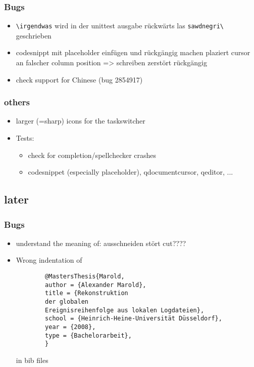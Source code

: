 \documentclass[10pt,a4paper,landscape]{report}
\begin{document}
\subsubsection{Bugs}
\begin{itemize}
\item \verb+\irgendwas+ wird in der unittest ausgabe rückwärts las \verb+sawdnegri\+ geschrieben
	\item codesnippt mit placeholder einfügen und rückgängig machen plaziert cursor an falscher column position => schreiben zerstört rückgängig
	\item check support for Chinese (bug 2854917)
\end{itemize}

\subsubsection{others}
\begin{itemize}
\item larger (=sharp) icons for the taskswitcher
	\item Tests: \begin{itemize}
		\item check for completion/spellchecker crashes
		\item codesnippet (especially placeholder), qdocumentcursor, qeditor, ...
	\end{itemize}	
\end{itemize}


\subsection{later}

\subsubsection{Bugs}
\begin{itemize}
	\item understand the meaning of: ausschneiden stört cut????
	\item Wrong indentation of \begin{verbatim}
		@MastersThesis{Marold,
		author = {Alexander Marold},
		title = {Rekonstruktion 
		der globalen 
		Ereignisreihenfolge aus lokalen Logdateien},
		school = {Heinrich-Heine-Universität Düsseldorf},
		year = {2008},
		type = {Bachelorarbeit},
		}
	\end{verbatim} in bib files
\end{itemize} 
\end{document}
